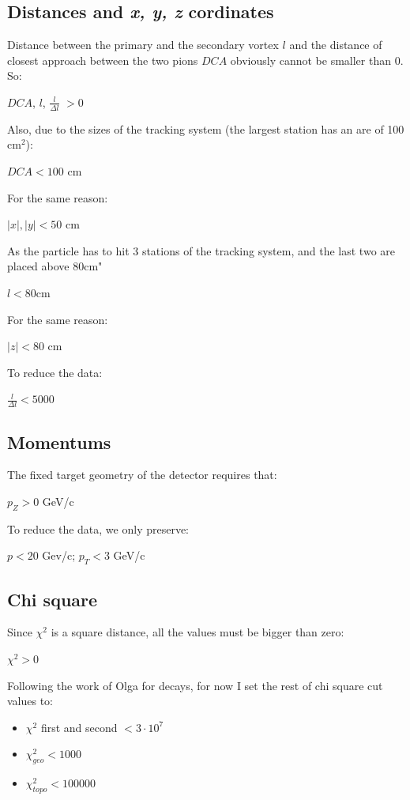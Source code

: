 \documentclass[11pt,a4paper]{article}
\begin{document}
\subsection{Distances and \emph{x, y, z} cordinates}
Distance between the primary and the secondary vortex $l$ and the distance of closest approach between the two pions $DCA$ obviously cannot be smaller than 0. So:
\begin{center}
    $DCA$, $l$, $\frac{l}{\Delta l}$ $> 0$
\end{center}
Also, due to the sizes of the tracking system (the largest station has an are of 100 cm$^2$):
\begin{center}
    $DCA < 100 $ cm
\end{center}
For the same reason:
\begin{center}
    $|x|, |y| < 50$ cm
\end{center}
As the particle has to hit 3 stations of the tracking system, and the last two are placed above 80cm"
\begin{center}
    $l < 80$cm
\end{center}
For the same reason:
\begin{center}
    $|z| < 80$ cm
\end{center}
To reduce the data:
\begin{center}
    $\frac{l}{\Delta l} < 5000$
\end{center}
\subsection{Momentums}
The fixed target geometry of the detector requires that:
\begin{center}
    $p_Z > 0 $ GeV/c
\end{center}
To reduce the data, we only preserve:
\begin{center}
    $p < 20$ Gev/c; $p_T < 3$ GeV/c
\end{center}
\subsection{Chi square}
Since $\chi^2$ is a square distance, all the values must be bigger than zero:
\begin{center}
    $\chi^2 > 0$
\end{center}
Following the work of Olga for \PLambda decays, for now I set the rest of chi square cut values to:
\begin{itemize}
    \item $\chi^2$ first and second $< 3 \cdot 10^7$
    \item $\chi^2_{geo} < 1000$
    \item $\chi^2_{topo} < 100000$
\end{itemize}
\end{document}
